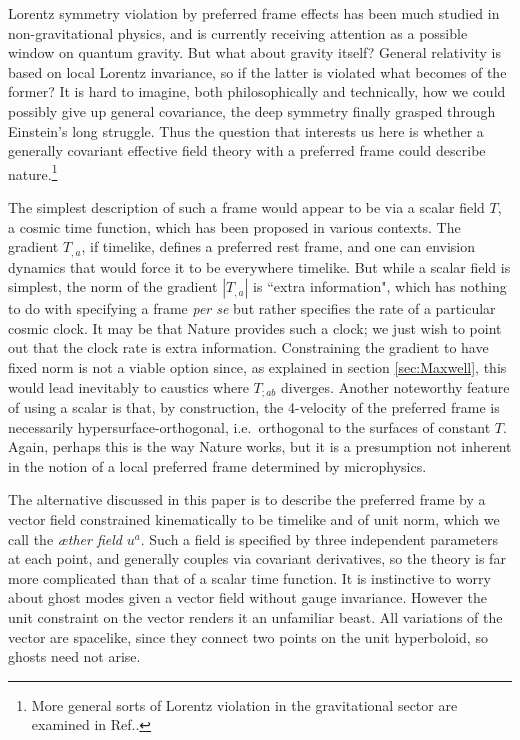 \documentclass[aps]{ws-procs9x6}
\begin{document}
Lorentz symmetry violation by preferred frame effects
has been much studied in non-gravitational physics,
and is currently receiving attention as a
possible window on quantum gravity.\cite{LVinQG}
But what about gravity itself?
General relativity is based on local
Lorentz invariance, so if the latter
is violated what becomes of the
former?
It is hard to imagine, both philosophically and technically,
how we could possibly give up general covariance,
the deep symmetry finally grasped through Einstein's long struggle.
Thus the question that interests us here is whether a generally
covariant effective field theory with a preferred frame
could describe nature.\footnote{More general sorts of
Lorentz violation in the gravitational sector are examined
in Ref..}

The simplest description of such a frame would appear to be via a
scalar field $T$, a cosmic time function, which has been proposed
in various contexts.\cite{JackiwPi,kflation,ghostcond1,ghostcond2}
%
The gradient $T_{,a}$, if timelike, defines a preferred rest
frame, and one can envision dynamics that would force it to be
everywhere timelike. But while a scalar field is simplest, the
norm of the gradient $|T_{,a}|$ is ``extra information", which
has nothing to do with specifying a frame {\it per se} but rather
specifies the rate of a particular cosmic clock. It may be that
Nature provides such a clock; we just wish to point out that the
clock rate is extra information. Constraining the gradient to
have fixed norm is not a viable option since, as explained in
section \ref{sec:Maxwell}, this would lead inevitably to caustics
where $T_{;ab}$ diverges. Another noteworthy feature of using a
scalar is that, by construction, the 4-velocity of the preferred
frame is necessarily hypersurface-orthogonal, i.e.~orthogonal to
the surfaces of constant $T$. Again, perhaps this is the way
Nature works, but it is a presumption not inherent in the notion
of a local preferred frame determined by microphysics.

The alternative discussed in this paper is to describe the
preferred frame by a vector field constrained kinematically to be
timelike and of unit norm, which we call the {\it {\ae}ther
field} $u^a$. Such a field is specified by three independent
parameters at each point, and generally couples via covariant
derivatives, so the theory is far more complicated than that of a
scalar time function. It is instinctive to worry about ghost modes
given a vector field without gauge invariance. However the unit
constraint on the vector renders it an unfamiliar beast. All
variations of the vector are spacelike, since they connect two
points on the unit hyperboloid, so ghosts need not arise.
\end{document}
